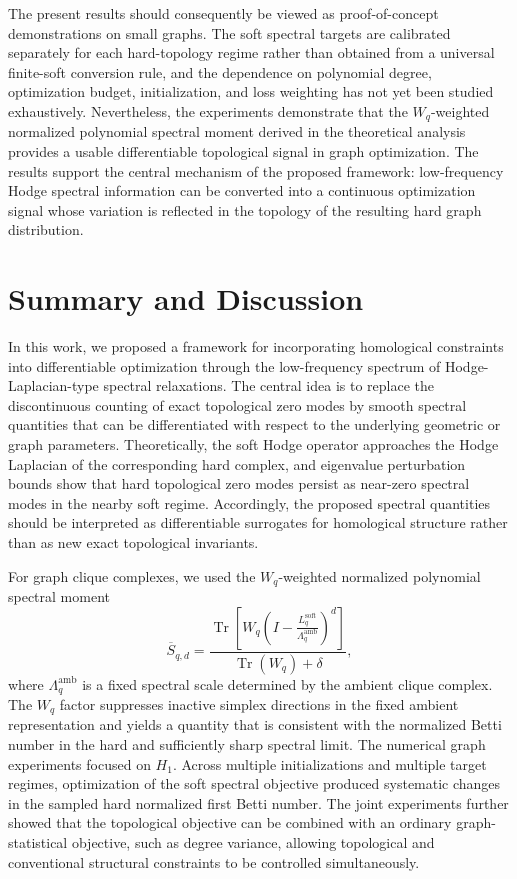 \documentclass[pdflatex,sn-mathphys-num]{sn-jnl}%
\theoremstyle{thmstyleone}%
\theoremstyle{thmstyletwo}%
\theoremstyle{thmstylethree}%
\begin{document}
The present results should consequently be viewed as proof-of-concept demonstrations on small graphs.
The soft spectral targets are calibrated separately for each hard-topology regime rather than obtained from a universal finite-soft conversion rule, and the dependence on polynomial degree, optimization budget, initialization, and loss weighting has not yet been studied exhaustively.
Nevertheless, the experiments demonstrate that the \(W_q\)-weighted normalized polynomial spectral moment derived in the theoretical analysis provides a usable differentiable topological signal in graph optimization.
The results support the central mechanism of the proposed framework: low-frequency Hodge spectral information can be converted into a continuous optimization signal whose variation is reflected in the topology of the resulting hard graph distribution.





\section{Summary and Discussion}

In this work, we proposed a framework for incorporating homological constraints into differentiable optimization through the low-frequency spectrum of Hodge-Laplacian-type spectral relaxations.
The central idea is to replace the discontinuous counting of exact topological zero modes by smooth spectral quantities that can be differentiated with respect to the underlying geometric or graph parameters.
Theoretically, the soft Hodge operator approaches the Hodge Laplacian of the corresponding hard complex, and eigenvalue perturbation bounds show that hard topological zero modes persist as near-zero spectral modes in the nearby soft regime.
Accordingly, the proposed spectral quantities should be interpreted as differentiable surrogates for homological structure rather than as new exact topological invariants.

For graph clique complexes, we used the \(W_q\)-weighted normalized polynomial spectral moment
\[
\overline{S}_{q,d}
=
\frac{
\operatorname{Tr}
\left[
W_q
\left(
I-
\frac{L_q^{\mathrm{soft}}}
{\Lambda_q^{\mathrm{amb}}}
\right)^d
\right]
}{
\operatorname{Tr}(W_q)+\delta
},
\]
where \(\Lambda_q^{\mathrm{amb}}\) is a fixed spectral scale determined by the ambient clique complex.
The \(W_q\) factor suppresses inactive simplex directions in the fixed ambient representation and yields a quantity that is consistent with the normalized Betti number in the hard and sufficiently sharp spectral limit.
The numerical graph experiments focused on \(H_1\).
Across multiple initializations and multiple target regimes, optimization of the soft spectral objective produced systematic changes in the sampled hard normalized first Betti number.
The joint experiments further showed that the topological objective can be combined with an ordinary graph-statistical objective, such as degree variance, allowing topological and conventional structural constraints to be controlled simultaneously.
\end{document}
